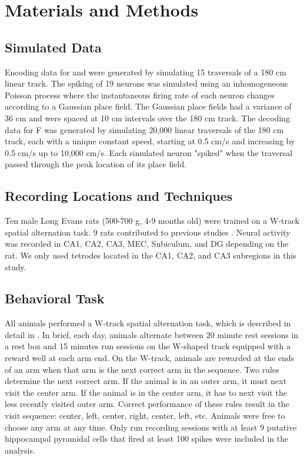 \documentclass[9pt,lineno]{elife}
\begin{document}
\section*{Materials and Methods}

\subsection*{Simulated Data}
Encoding data for  and  were generated by simulating 15 traversals of a 180 cm linear track. The spiking of 19 neurons was simulated using an inhomogeneous Poisson process where the instantaneous firing rate of each neuron changes according to a Gaussian place field. The Gaussian place fields had a variance of 36 cm and were spaced at 10 cm intervals over the 180 cm track. The decoding data for F was generated by simulating 20,000 linear traversals of the 180 cm track, each with a unique constant speed, starting at 0.5 cm/s and increasing by 0.5 cm/s up to 10,000 cm/s. Each simulated neuron "spiked" when the traversal passed through the peak location of its place field.

\subsection*{Recording Locations and Techniques}
Ten male Long Evans rats (500-700 g, 4-9 months old) were trained on a W-track spatial alternation task. 9 rats contributed to previous studies \citep{KarlssonAwakereplayremote2009, KayConstantSubsecondCycling2020, Kayhippocampalnetworkspatial2016, CarrTransientSlowGamma2012}. Neural activity was recorded in CA1, CA2, CA3, MEC, Subiculum, and DG depending on the rat. We only used tetrodes located in the CA1, CA2, and CA3 subregions in this study.

\subsection*{Behavioral Task}
All animals performed a W-track spatial alternation task, which is described in detail in \cite{KarlssonAwakereplayremote2009}. In brief, each day, animals alternate between 20 minute rest sessions in a rest box and 15 minutes run sessions on the W-shaped track equipped with a reward well at each arm end. On the W-track, animals are rewarded at the ends of an arm when that arm is the next correct arm in the sequence. Two rules determine the next correct arm. If the animal is in an outer arm, it must next visit the center arm. If the animal is in the center arm, it has to next visit the less recently visited outer arm. Correct performance of these rules result in the visit sequence: center, left, center, right, center, left, etc. Animals were free to choose any arm at any time. Only run recording sessions with at least 9 putative hippocampal pyramidal cells that fired at least 100 spikes were included in the analysis.
\end{document}
